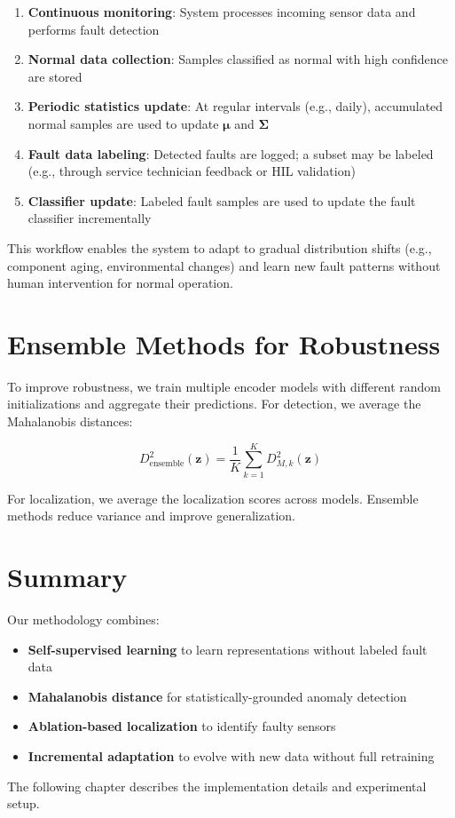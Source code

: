 \begin{enumerate}
    \item \textbf{Continuous monitoring}: System processes incoming sensor data and performs fault detection
    \item \textbf{Normal data collection}: Samples classified as normal with high confidence are stored
    \item \textbf{Periodic statistics update}: At regular intervals (e.g., daily), accumulated normal samples are used to update $\boldsymbol{\mu}$ and $\boldsymbol{\Sigma}$
    \item \textbf{Fault data labeling}: Detected faults are logged; a subset may be labeled (e.g., through service technician feedback or HIL validation)
    \item \textbf{Classifier update}: Labeled fault samples are used to update the fault classifier incrementally
\end{enumerate}

This workflow enables the system to adapt to gradual distribution shifts (e.g., component aging, environmental changes) and learn new fault patterns without human intervention for normal operation.

\section{Ensemble Methods for Robustness}

To improve robustness, we train multiple encoder models with different random initializations and aggregate their predictions. For detection, we average the Mahalanobis distances:

\begin{equation}
D_{\text{ensemble}}^2(\mathbf{z}) = \frac{1}{K} \sum_{k=1}^{K} D_{M,k}^2(\mathbf{z})
\end{equation}

For localization, we average the localization scores across models. Ensemble methods reduce variance and improve generalization.

\section{Summary}

Our methodology combines:
\begin{itemize}
    \item \textbf{Self-supervised learning} to learn representations without labeled fault data
    \item \textbf{Mahalanobis distance} for statistically-grounded anomaly detection
    \item \textbf{Ablation-based localization} to identify faulty sensors
    \item \textbf{Incremental adaptation} to evolve with new data without full retraining
\end{itemize}

The following chapter describes the implementation details and experimental setup.
